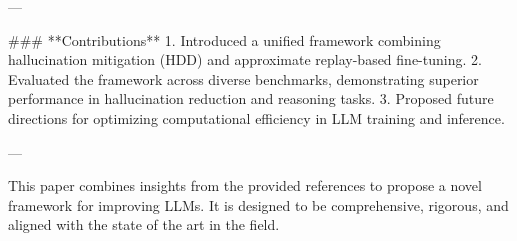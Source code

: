 ---

### **Contributions**  
1. Introduced a unified framework combining hallucination mitigation (HDD) and approximate replay-based fine-tuning.
2. Evaluated the framework across diverse benchmarks, demonstrating superior performance in hallucination reduction and reasoning tasks.
3. Proposed future directions for optimizing computational efficiency in LLM training and inference.

--- 

This paper combines insights from the provided references to propose a novel framework for improving LLMs. It is designed to be comprehensive, rigorous, and aligned with the state of the art in the field.